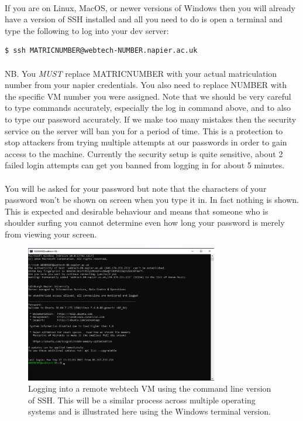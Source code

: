 \documentclass[12pt, a4paper, oneside]{book}
\begin{document}
\paragraph{} If you are on Linux, MacOS, or newer versions of Windows then you will already have a version of SSH installed and all you need to do is open a terminal and type the following to log into your dev server:

\begin{lstlisting}[style=DOS]
    $ ssh MATRICNUMBER@webtech-NUMBER.napier.ac.uk
\end{lstlisting}

\paragraph{} NB. You \emph{MUST} replace MATRICNUMBER with your actual matriculation number from your napier credentials. You also need to replace NUMBER with the specific VM number you were assigned. Note that we should be very careful to type commands accurately, especially the log in command above, and to also to type our password accurately. If we make too many mistakes then the security service on the server will ban you for a period of time. This is a protection to stop attackers from trying multiple attempts at our passwords in order to gain access to the machine. Currently the security setup is quite sensitive, about 2 failed login attempts can get you banned from logging in for about 5 minutes.

\paragraph{} You will be asked for your password but note that the characters of your password won't be shown on screen when you type it in. In fact nothing is shown. This is expected and desirable behaviour and means that someone who is shoulder surfing you cannot determine even how long your password is merely from viewing your screen.

\begin{figure}[H]
\centering
\includegraphics[width=0.75\textwidth]{images/cli_ssh_session_login.png}
\caption{Logging into a remote webtech VM using the command line version of SSH. This will be a similar process across multiple operating systems and is illustrated here using the Windows terminal version.}
\label{fig:cli-ssh-session-login}
\end{figure}
\end{document}
